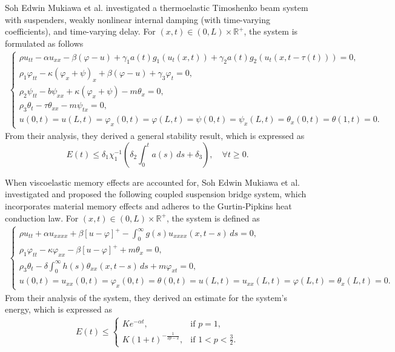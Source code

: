 \documentclass[11pt,reqno]{article}
\begin{document}
	Soh Edwin Mukiawa et al. \cite{MR4539428} investigated a thermoelastic Timoshenko beam system with suspenders, weakly nonlinear internal damping (with time-varying coefficients), and time-varying delay. For $(x,t) \in (0,L) \times \mathbb{R}^+$, the system is formulated as follows
\begin{align*}
    \begin{cases}
        \rho u_{tt}- \alpha u_{xx} - \beta (\varphi - u)+ \gamma_1 a(t) g_1 (u_t(x,t)) + \gamma_2 a(t) g_2 (u_t(x,t - \tau(t))) = 0, \\
        \rho_1 \varphi_{tt} - \kappa(\varphi_x + \psi)_x + \beta (\varphi - u)+ \gamma_3 \varphi_t = 0, \\
        \rho_2 \psi_{tt} - b \psi_{xx}+ \kappa(\varphi_x + \psi) - m \theta_x = 0, \\
        \rho_3 \theta_t - \tau \theta_{xx} - m \psi_{tx}= 0, \\
        u(0,t)=u(L,t)=\varphi_{x}(0,t)=\varphi(L,t)=\psi(0,t)=\psi_{x}(L,t) = \theta_{x}(0,t)=\theta(1,t)=0.
    \end{cases}
\end{align*}
From their analysis, they derived a general stability result, which is expressed as
\[
    E(t) \leq \delta_1 \chi_1^{-1} \left( \delta_2 \int_0^t a(s) \, ds + \delta_3 \right), \quad \forall t \geq 0.\]
	
When viscoelastic memory effects are accounted for, Soh Edwin Mukiawa et al. \cite{MR4913141} investigated and proposed the following coupled suspension bridge system, which incorporates material memory effects and adheres to the Gurtin-Pipkins heat conduction law. For $(x,t) \in (0,L) \times \mathbb{R}^+$, the system is defined as
\begin{align*}
    \begin{cases}
        \rho u_{tt} + \alpha u_{xxxx} + \beta[u - \varphi]^+ - \int_0^{\infty} g(s) u_{xxxx}(x,t-s) \, ds = 0,  \\
        \rho_1 \varphi_{tt} - \kappa \varphi_{xx} - \beta [u - \varphi]^+ + m \theta_x = 0,  \\
        \rho_3 \theta_t - \delta \int_0^{\infty} h(s) \theta_{xx}(x,t-s) \, ds + m \varphi_{xt} = 0,  \\
        u(0,t) = u_{xx}(0,t) = \varphi_x(0,t) = \theta(0,t) =
        u(L,t) = u_{xx}(L,t) = \varphi(L,t) = \theta_x(L,t) = 0.
    \end{cases}
\end{align*}
From their analysis of the system, they derived an estimate for the system's energy, which is expressed as
\begin{align*}
    E(t) \leq
    \begin{cases}
        K e^{-\alpha t}, & \text{if } p = 1, \\
        K (1 + t)^{-\frac{1}{2p-2}}, & \text{if } 1 < p < \frac{3}{2}.
    \end{cases}
\end{align*}
	
\end{document}
